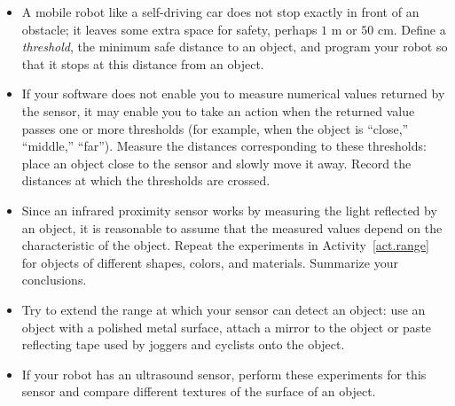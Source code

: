 \medskip

\begin{framed}

\begin{itemize}
\item A mobile robot like a self-driving car does not stop exactly in front of an obstacle; it leaves some extra space for safety, perhaps $1$ m or $50$ cm. Define a \emph{threshold}, the minimum safe distance to an object, and program your robot so that it stops at this distance from an object.
\item If your software does not enable you to measure numerical values returned by the sensor, it may enable you to take an action when the returned value passes one or more thresholds (for example, when the object is ``close,'' ``middle,'' ``far''). Measure the distances corresponding to these thresholds:  place an object close to the sensor and slowly move it away. Record the distances at which the thresholds are crossed.
\end{itemize}
\end{framed}

\begin{framed}

\begin{itemize}
\item Since an infrared proximity sensor works by measuring the light reflected by an object, it is reasonable to assume that the measured values depend on the characteristic of the object. Repeat the experiments in Activity~\ref{act.range} for objects of different shapes, colors, and materials. Summarize your conclusions.
\item Try to extend the range at which your sensor can detect an object: use an object with a polished metal surface, attach a mirror to the object or paste reflecting tape used by joggers and cyclists onto the object.
\item If your robot has an ultrasound sensor, perform these experiments for this sensor and compare different textures of the surface of an object.
\end{itemize}
\end{framed}


